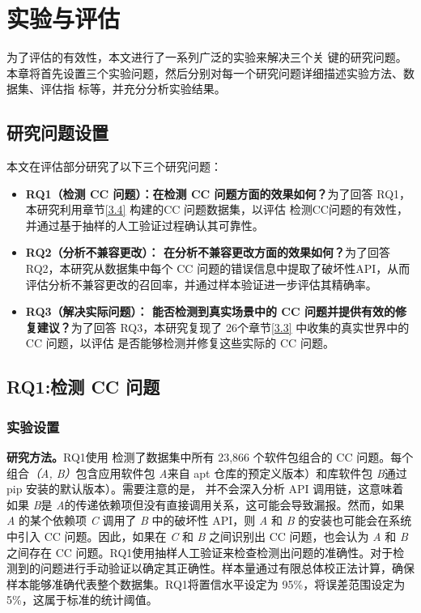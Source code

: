\chapter{实验与评估}
为了评估\tool{}的有效性，本文进行了一系列广泛的实验来解决三个关
键的研究问题。本章将首先设置三个实验问题，然后分别对每一个研究问题详细描述实验方法、数据集、评估指
标等，并充分分析实验结果。

\section{研究问题设置}
本文在评估部分研究了以下三个研究问题：
\begin{itemize}
	\item \textbf{RQ1（检测 CC 问题）：\tool{}在检测 CC 问题方面的效果如何？}为了回答 RQ1，本研究利用章节\ref{3.4} 构建的CC 问题数据集，以评估\tool{} 检测CC问题的有效性，并通过基于抽样的人工验证过程确认其可靠性。
	\item \textbf{RQ2（分析不兼容更改）：\tool{} 在分析不兼容更改方面的效果如何？}为了回答 RQ2，本研究从数据集中每个 CC 问题的错误信息中提取了破坏性API，从而评估分析不兼容更改的召回率，并通过样本验证进一步评估其精确率。
	\item \textbf{RQ3（解决实际问题）：\tool{} 能否检测到真实场景中的 CC 问题并提供有效的修复建议？}为了回答 RQ3，本研究复现了 26个章节\ref{3.3} 中收集的真实世界中的 CC 问题，以评估 \tool{} 是否能够检测并修复这些实际的 CC 问题。
\end{itemize}

\section{RQ1:检测 CC 问题}
\subsection{实验设置}
\textbf{研究方法。}RQ1使用 \tool{} 检测了数据集中所有 23,866 个软件包组合的 CC 问题。每个组合\textit{（A, B）}包含应用软件包 \textit{A}来自 apt 仓库的预定义版本）和库软件包 \textit{B}通过 pip 安装的默认版本）。需要注意的是， \tool{} 并不会深入分析 API 调用链，这意味着如果 \textit{B}是 \textit{A}的传递依赖项但没有直接调用关系，这可能会导致漏报。然而，如果 \textit{A} 的某个依赖项 \textit{C} 调用了 \textit{B} 中的破坏性 API，则 \textit{A} 和 \textit{B} 的安装也可能会在系统中引入 CC 问题。因此，如果在 \textit{C} 和 \textit{B} 之间识别出 CC 问题，也会认为 \textit{A} 和 \textit{B} 之间存在 CC 问题。RQ1使用抽样人工验证来检查检测出问题的准确性。对于检测到的问题进行手动验证以确定其正确性。样本量通过有限总体校正法计算，确保样本能够准确代表整个数据集。RQ1将置信水平设定为 95\%，将误差范围设定为 5\%，这属于标准的统计阈值。

